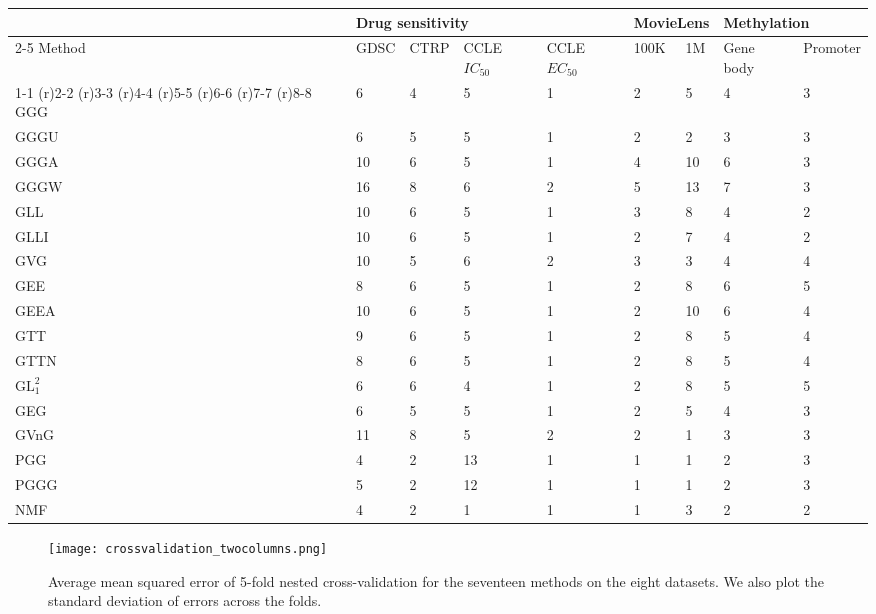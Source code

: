 \documentclass{article}
\begin{document}
		\begin{table*}[h]
			\caption{Average dimensionality found in 5-fold nested cross-validation for each method on the eight datasets.} \label{crossvalidation_table}
			\centering
			\begin{tabular}{lllllllll}%
				\toprule
				& \multicolumn{4}{l}{Drug sensitivity} & \multicolumn{2}{l}{MovieLens} & \multicolumn{2}{l}{Methylation} \\
				\cmidrule(r){2-5} \cmidrule{6-7} \cmidrule{8-9}
				Method & GDSC & CTRP & CCLE $IC_{50}$ & CCLE $EC_{50}$ & 100K & 1M & Gene body & Promoter \\
				\cmidrule(r){1-1} \cmidrule(r){2-2} \cmidrule(r){3-3} \cmidrule(r){4-4} \cmidrule(r){5-5} \cmidrule(r){6-6} \cmidrule(r){7-7} \cmidrule(r){8-8} \cmidrule{9-9}
				GGG & 6 & 4 & 5 & 1 & 2 & 5 & 4 & 3 \\
				GGGU & 6 & 5 & 5 & 1 & 2 & 2 & 3 & 3 \\
				GGGA & 10 & 6 & 5 & 1 & 4 & 10 & 6 & 3 \\
				GGGW & 16 & 8 & 6 & 2 & 5 & 13 & 7 & 3 \\
				GLL & 10 & 6 & 5 & 1 & 3 & 8 & 4 & 2 \\
				GLLI & 10 & 6 & 5 & 1 & 2 & 7 & 4 & 2 \\
				GVG & 10 & 5 & 6 & 2 & 3 & 3 & 4 & 4 \\
				\midrule
				GEE & 8 & 6 & 5 & 1 & 2 & 8 & 6 & 5 \\
				GEEA & 10 & 6 & 5 & 1 & 2 & 10 & 6 & 4 \\
				GTT & 9 & 6 & 5 & 1 & 2 & 8 & 5 & 4 \\
				GTTN & 8 & 6 & 5 & 1 & 2 & 8 & 5 & 4 \\
				$\text{GL}^2_1$ & 6 & 6 & 4 & 1 & 2 & 8 & 5 & 5 \\
				\midrule
				GEG & 6 & 5 & 5 & 1 & 2 & 5 & 4 & 3 \\
				GVnG & 11 & 8 & 5 & 2 & 2 & 1 & 3 & 3 \\
				\midrule
				PGG & 4 & 2 & 13 & 1 & 1 & 1 & 2 & 3 \\
				PGGG & 5 & 2 & 12 & 1 & 1 & 1 & 2 & 3 \\
				\midrule
				NMF & 4 & 2 & 1 & 1 & 1 & 3 & 2 & 2 \\
				\bottomrule
			\end{tabular}
		\end{table*}
	
		\begin{figure}[h]
			\centering
			\texttt{[image: crossvalidation\_twocolumns.png]}
			\caption{Average mean squared error of 5-fold nested cross-validation for the seventeen methods on the eight datasets. We also plot the standard deviation of errors across the folds.} 
			\label{crossvalidation}
		\end{figure}
		
\end{document}

